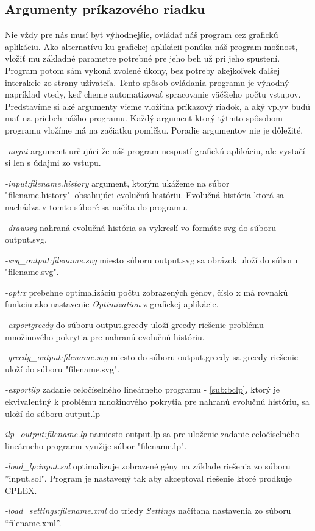 \subsection{Argumenty príkazového riadku}
Nie vždy pre nás musí byť výhodnejšie, ovládať náš program cez grafickú aplikáciu. 
Ako alternatívu ku grafickej aplikácii ponúka náš program možnost, vložiť mu základné parametre potrebné pre jeho beh už pri jeho spustení.
Program potom sám vykoná zvolené úkony, bez potreby akejkoľvek ďalšej interakcie zo strany uživateľa. 
Tento spôsob ovládania programu je výhodný napríklad vtedy, keď cheme automatizovať spracovanie väčšieho počtu vstupov.
Predstavíme si aké argumenty vieme vložiťna príkazový riadok, a aký vplyv budú mať na priebeh nášho programu. 
Každý argument ktorý týtmto spôsobom programu vložíme má na začiatku pomlčku. Poradie argumentov nie je dôležité.

\emph{-nogui} argument určujúci že náš program nespustí grafickú aplikáciu, ale vystačí si len s údajmi zo vstupu.

\emph{-input:filename.history} argument, ktorým ukážeme na súbor "filename.history"\ obsahujúci evolučnú históriu.
Evolučná história ktorá sa nachádza v tomto súboré sa načíta do programu.

\emph{-drawsvg} nahraná evolučná história sa vykreslí vo formáte svg do súboru output.svg.

\emph{-svg\_output:filename.svg} miesto súboru output.svg sa obrázok uloží do súboru "filename.svg".

\emph{-opt:x} prebehne optimalizáciu počtu zobrazených génov, číslo x má rovnakú funkciu ako nastavenie \emph{Optimization} z grafickej aplikácie.

\emph{-exportgreedy} do súboru output.greedy uloží greedy riešenie problému množinového pokrytia pre nahranú evolučnú históriu.

\emph{-greedy\_output:filename.svg} miesto do súboru output.greedy sa greedy riešenie uloží do súboru "filename.svg".

\emph{-exportilp} zadanie celočíselného lineárneho programu - \ref{sub:bclp},
ktorý je ekvivalentný k problému množinového pokrytia pre nahranú evolučnú históriu, sa uloží do súboru output.lp

\emph{ilp\_output:filename.lp} namiesto output.lp sa pre uloženie zadanie celočíselného lineárneho programu využije súbor "filename.lp".

\emph{-load\_lp:input.sol} optimalizuje zobrazené gény na základe riešenia zo súboru ''input.sol".
Program je nastavený tak aby akceptoval riešenie ktoré prodkuje CPLEX.

\emph{-load\_settings:filename.xml} do triedy \emph{Settings} načítana nastavenia zo súboru ``filename.xml''.

